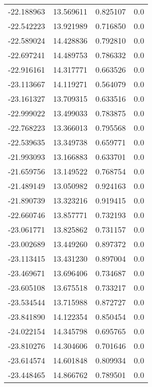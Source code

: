 \begin{tabular}{rrrr}
      -22.188963 &        13.569611 &    0.825107 &   0.0 \\
      -22.542223 &        13.921989 &    0.716850 &   0.0 \\
      -22.589024 &        14.428836 &    0.792810 &   0.0 \\
      -22.697241 &        14.489753 &    0.786332 &   0.0 \\
      -22.916161 &        14.317771 &    0.663526 &   0.0 \\
      -23.113667 &        14.119271 &    0.564079 &   0.0 \\
      -23.161327 &        13.709315 &    0.633516 &   0.0 \\
      -22.999022 &        13.499033 &    0.783875 &   0.0 \\
      -22.768223 &        13.366013 &    0.795568 &   0.0 \\
      -22.539635 &        13.349738 &    0.659771 &   0.0 \\
      -21.993093 &        13.166883 &    0.633701 &   0.0 \\
      -21.659756 &        13.149522 &    0.768754 &   0.0 \\
      -21.489149 &        13.050982 &    0.924163 &   0.0 \\
      -21.890739 &        13.323216 &    0.919415 &   0.0 \\
      -22.660746 &        13.857771 &    0.732193 &   0.0 \\
      -23.061771 &        13.825862 &    0.731157 &   0.0 \\
      -23.002689 &        13.449260 &    0.897372 &   0.0 \\
      -23.113415 &        13.431230 &    0.897004 &   0.0 \\
      -23.469671 &        13.696406 &    0.734687 &   0.0 \\
      -23.605108 &        13.675518 &    0.733217 &   0.0 \\
      -23.534544 &        13.715988 &    0.872727 &   0.0 \\
      -23.841890 &        14.122354 &    0.850454 &   0.0 \\
      -24.022154 &        14.345798 &    0.695765 &   0.0 \\
      -23.810276 &        14.304606 &    0.701646 &   0.0 \\
      -23.614574 &        14.601848 &    0.809934 &   0.0 \\
      -23.448465 &        14.866762 &    0.789501 &   0.0 \\

\end{tabular}
